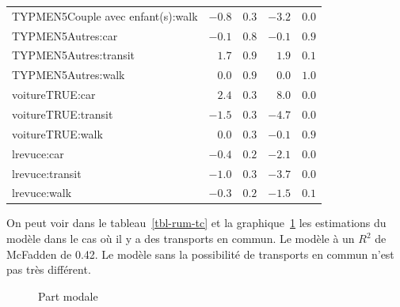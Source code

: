 \documentclass[
  9pt,
  a4paper,
  DIV=11]{scrreprt}
\begin{document}
\begin{longtable}{lrrrr}
TYPMEN5Couple avec enfant(s):walk & $-0.8$ & $0.3$ & $-3.2$ & $0.0$ \\ 
TYPMEN5Autres:car & $-0.1$ & $0.8$ & $-0.1$ & $0.9$ \\ 
TYPMEN5Autres:transit & $1.7$ & $0.9$ & $1.9$ & $0.1$ \\ 
TYPMEN5Autres:walk & $0.0$ & $0.9$ & $0.0$ & $1.0$ \\ 
voitureTRUE:car & $2.4$ & $0.3$ & $8.0$ & $0.0$ \\ 
voitureTRUE:transit & $-1.5$ & $0.3$ & $-4.7$ & $0.0$ \\ 
voitureTRUE:walk & $0.0$ & $0.3$ & $-0.1$ & $0.9$ \\ 
lrevuce:car & $-0.4$ & $0.2$ & $-2.1$ & $0.0$ \\ 
lrevuce:transit & $-1.0$ & $0.3$ & $-3.7$ & $0.0$ \\ 
lrevuce:walk & $-0.3$ & $0.2$ & $-1.5$ & $0.1$ \\ 
\bottomrule

\end{longtable}

On peut voir dans le tableau~\ref{tbl-rum-tc} et la
graphique~\ref{fig-modale} les estimations du modèle dans le cas où il y
a des transports en commun. Le modèle à un \(R^2\) de McFadden de 0.42.
Le modèle sans la possibilité de transports en commun n'est pas très
différent.

\begin{figure}[htb]

\caption{\label{fig-modale}Part modale}


\end{figure}%
\end{document}
